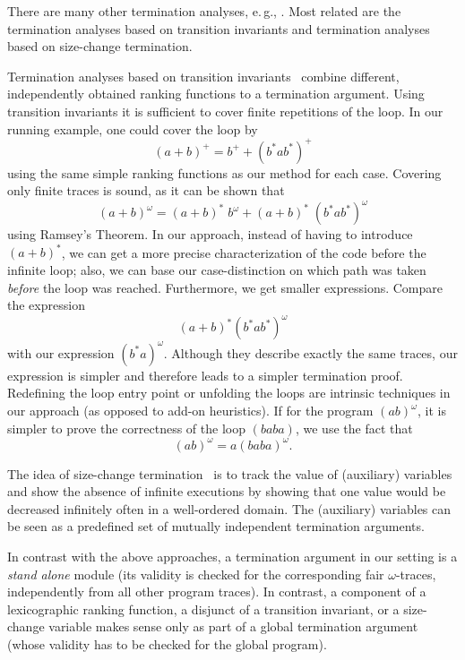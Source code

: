 There are many other termination analyses, e.\,g., \cite{sefm/BabicHRC07,conf/tacas/CookSZ13,popl/CousotC12,cav/GantyG13,rta/GieslTSF04,conf/pldi/GrebenshchikovLPR12,conf/esop/UrbanM14}.  
Most related  are the termination analyses based on transition invariants and 
termination analyses based on size-change termination.

Termination analyses based on transition
invariants~\cite{conf/cav/BrockschmidtCF13,pldi/CookPR06,cacm/CookPR11,sas/HarrisLNR10,cav/KroeningSTW10,cav/LeeWY12,lics/PodelskiR04,popl/PodelskiR05}
combine different, independently obtained ranking functions to a termination argument. 
Using transition invariants it is sufficient to cover finite repetitions of the loop.
In our running example, one could cover the loop by
$$(a+b)^+ = b^+ + (b^*ab^*)^+$$
using the same simple ranking functions as our method for each case.  
Covering only finite traces is sound, as it can be shown that
$$(a+b)^\omega = (a+b)^* \; b^\omega + (a+b)^* \; (b^*ab^*)^\omega$$
using Ramsey's Theorem.
In our approach,  instead of having to
introduce $(a+b)^*$, we can get a more precise characterization
of the code before the infinite loop; also, we can  base our case-distinction
on which path was taken \emph{before} the loop was reached.
Furthermore, we 
get smaller expressions.  Compare the
expression $$(a+b)^*(b^*ab^*)^\omega$$ with our expression
$(b^*a)^\omega$.  Although they describe exactly the same traces, our
expression is simpler and therefore leads to a simpler termination
proof.
Redefining the loop entry point or unfolding
the loops are intrinsic techniques in our approach (as opposed to add-on heuristics).  If for the program $(ab)^\omega$, it is simpler
to prove the correctness of the loop $(baba)$, we  use
the fact that
$$(ab)^\omega = a(baba)^\omega.$$


The idea of size-change
termination~\cite{cav/Ben-Amram09,journals/corr/abs-1110-6183,popl/LeeJB01}
is to track the value of (auxiliary) variables and show the absence of infinite executions by showing that one value would be decreased infinitely often in a well-ordered domain.
The (auxiliary) variables can be seen as a predefined set of mutually
independent termination arguments. 


In contrast with the above approaches,  a termination argument in our setting is a \emph{stand alone} module (its validity is checked
for the corresponding fair $\omega$-traces, independently from all other program traces).  In contrast, a component of a
lexicographic ranking function, a disjunct of a transition invariant,
or a size-change variable
makes sense only as part of a global termination argument (whose
validity has to be checked for the global program).

